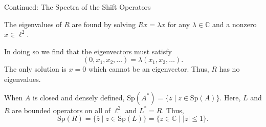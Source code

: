 \documentclass[aspectratio=169]{beamer}
\begin{document}
\begin{frame}{Continued: The Spectra of the Shift Operators}

    The eigenvalues of $R$ are found by solving $Rx = \lambda x$ for any $\lambda \in \mathbb{C}$ and a nonzero $x \in \ell^2.$
     \vspace{1em}
     
    In doing so we find that the eigenvectors must satisfy
    $$ (0, x_1, x_2, \dots) = \lambda(x_1, x_2, \dots).$$ 
   The only solution is $x=0$ which cannot be an eigenvector. Thus, $R$ has no eigenvalues.

     \vspace{1em}

    When $A$ is closed and densely defined, $\text{Sp}(A^*) = \{\overline{z} \mid z \in \text{Sp}(A) \}.$ Here, $L$ and $R$ are bounded operators on all of $\ell^2$ and $L^* = R$. Thus, 
    $$ \text{Sp}(R) = \{\overline{z} \mid z \in \text{Sp}(L) \} = \{ z \in \mathbb{C} \mid |z| \le 1 \}.$$



\end{frame}
\end{document}
